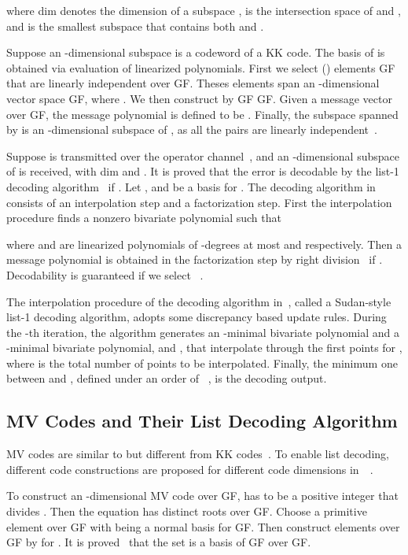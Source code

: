 \documentclass[11pt,onecolumn,draftcls]{IEEEtran}
\begin{document}
where dim denotes the dimension of a subspace ,  is the intersection space of  and , and  is the smallest subspace that contains both  and .

Suppose an -dimensional subspace  is a codeword of a KK code. The basis of  is obtained via evaluation of linearized polynomials. First we select  () elements  GF that are linearly independent over GF. Theses  elements span an -dimensional vector space  GF, where . We then construct  by  GF GF. Given a message vector  over GF, the message polynomial is defined to be . Finally, the subspace spanned by  is an -dimensional subspace of , as all the pairs  are linearly independent~\cite{kotter_it08}.

Suppose  is transmitted over the operator channel~\cite{kotter_it08}, and an -dimensional subspace  of  is received, with dim and . It is proved that the error is decodable by the list-1 decoding algorithm~\cite{kotter_it08} if .
Let , and  be a basis for . The decoding algorithm in~\cite{kotter_it08} consists of an interpolation step and a factorization step. First the interpolation procedure finds a nonzero bivariate polynomial  such that

where  and  are linearized polynomials of -degrees at most  and  respectively. Then a message polynomial  is obtained in the factorization step by right division~\cite{kotter_it08} if . Decodability is guaranteed if we select ~\cite{kotter_it08}.

The interpolation procedure of the decoding algorithm in~\cite{kotter_it08}, called  a Sudan-style list-1 decoding algorithm,  adopts some discrepancy based update rules. During the -th iteration, the algorithm generates an -minimal bivariate polynomial and a -minimal bivariate polynomial,  and , that interpolate through the first  points for , where  is the total number of points to be interpolated. Finally, the minimum one between  and , defined under an order of ~\cite{kotter_it08}, is the decoding output.



\subsection{MV Codes and Their List Decoding Algorithm}
\label{sec: introMV}
MV codes are similar to but different from KK codes~\cite{kotter_it08}. To enable list decoding, different code constructions are proposed for different code dimensions in~\cite{mahdavifar_isit10}~\cite{mahdavifar_it10}.

To construct an -dimensional MV code over GF,  has to be a positive integer that divides . Then the equation  has  distinct roots  over GF. Choose a primitive element  over GF with  being a normal basis for GF. Then construct elements  over GF by  for . It is proved~\cite{mahdavifar_it10} that the set  is a basis of GF over GF.
\end{document}
